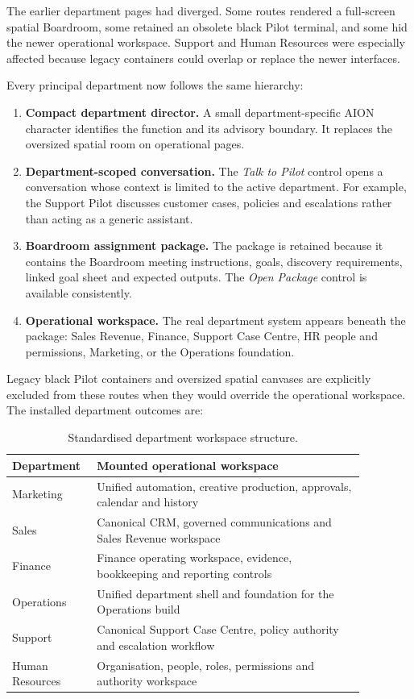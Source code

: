 The earlier department pages had diverged. Some routes rendered a full-screen
spatial Boardroom, some retained an obsolete black Pilot terminal, and some hid
the newer operational workspace. Support and Human Resources were especially
affected because legacy containers could overlap or replace the newer interfaces.

Every principal department now follows the same hierarchy:

\begin{enumerate}
    \item \textbf{Compact department director.} A small department-specific AION
    character identifies the function and its advisory boundary. It replaces the
    oversized spatial room on operational pages.
    \item \textbf{Department-scoped conversation.} The \emph{Talk to Pilot}
    control opens a conversation whose context is limited to the active
    department. For example, the Support Pilot discusses customer cases,
    policies and escalations rather than acting as a generic assistant.
    \item \textbf{Boardroom assignment package.} The package is retained because
    it contains the Boardroom meeting instructions, goals, discovery requirements,
    linked goal sheet and expected outputs. The \emph{Open Package} control is
    available consistently.
    \item \textbf{Operational workspace.} The real department system appears
    beneath the package: Sales Revenue, Finance, Support Case Centre, HR people
    and permissions, Marketing, or the Operations foundation.
\end{enumerate}

Legacy black Pilot containers and oversized spatial canvases are explicitly
excluded from these routes when they would override the operational workspace.
The installed department outcomes are:

\begin{table}[htbp]
\centering
\small
\begin{tabular}{p{0.17\linewidth} p{0.70\linewidth}}
\toprule
\textbf{Department} & \textbf{Mounted operational workspace} \\
\midrule
Marketing & Unified automation, creative production, approvals, calendar and history \\
Sales & Canonical CRM, governed communications and Sales Revenue workspace \\
Finance & Finance operating workspace, evidence, bookkeeping and reporting controls \\
Operations & Unified department shell and foundation for the Operations build \\
Support & Canonical Support Case Centre, policy authority and escalation workflow \\
Human Resources & Organisation, people, roles, permissions and authority workspace \\
\bottomrule
\end{tabular}
\caption{Standardised department workspace structure.}
\end{table}

